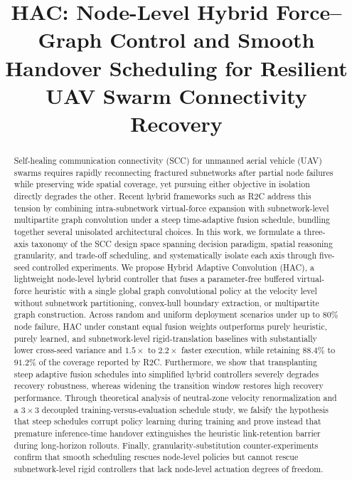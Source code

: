 \documentclass[11pt]{article}
\title{HAC: Node-Level Hybrid Force--Graph Control and Smooth Handover Scheduling for Resilient UAV Swarm Connectivity Recovery}
\author{}
\date{}
\theoremstyle{plain}
\theoremstyle{definition}
\theoremstyle{remark}
\begin{document}
\maketitle

\begin{abstract}
Self-healing communication connectivity (SCC) for unmanned aerial vehicle (UAV) swarms requires rapidly reconnecting fractured subnetworks after partial node failures while preserving wide spatial coverage, yet pursuing either objective in isolation directly degrades the other. Recent hybrid frameworks such as R2C address this tension by combining intra-subnetwork virtual-force expansion with subnetwork-level multipartite graph convolution under a steep time-adaptive fusion schedule, bundling together several unisolated architectural choices. In this work, we formulate a three-axis taxonomy of the SCC design space spanning decision paradigm, spatial reasoning granularity, and trade-off scheduling, and systematically isolate each axis through five-seed controlled experiments. We propose Hybrid Adaptive Convolution (HAC), a lightweight node-level hybrid controller that fuses a parameter-free buffered virtual-force heuristic with a single global graph convolutional policy at the velocity level without subnetwork partitioning, convex-hull boundary extraction, or multipartite graph construction. Across random and uniform deployment scenarios under up to $80\%$ node failure, HAC under constant equal fusion weights outperforms purely heuristic, purely learned, and subnetwork-level rigid-translation baselines with substantially lower cross-seed variance and $1.5\times$ to $2.2\times$ faster execution, while retaining $88.4\%$ to $91.2\%$ of the coverage reported by R2C. Furthermore, we show that transplanting steep adaptive fusion schedules into simplified hybrid controllers severely degrades recovery robustness, whereas widening the transition window restores high recovery performance. Through theoretical analysis of neutral-zone velocity renormalization and a $3 \times 3$ decoupled training-versus-evaluation schedule study, we falsify the hypothesis that steep schedules corrupt policy learning during training and prove instead that premature inference-time handover extinguishes the heuristic link-retention barrier during long-horizon rollouts. Finally, granularity-substitution counter-experiments confirm that smooth scheduling rescues node-level policies but cannot rescue subnetwork-level rigid controllers that lack node-level actuation degrees of freedom.
\end{abstract}
\end{document}
